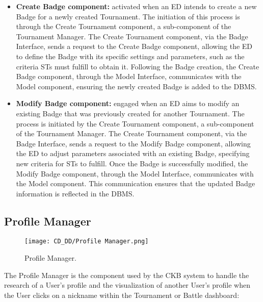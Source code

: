 \begin{itemize}
    \item \textbf{Create Badge component:} activated when an ED intends to create a new Badge for a newly created Tournament. The initiation of this process is through the Create Tournament component, a sub-component of the Tournament Manager. The Create Tournament component, via the Badge Interface, sends a request to the Create Badge component, allowing the ED to define the Badge with its specific settings and parameters, such as the criteria STs must fulfill to obtain it. Following the Badge creation, the Create Badge component, through the Model Interface, communicates with the Model component, ensuring the newly created Badge is added to the DBMS.
    \item \textbf{Modify Badge component:} engaged when an ED aims to modify an existing Badge that was previously created for another Tournament. The process is initiated by the Create Tournament component, a sub-component of the Tournament Manager. The Create Tournament component, via the Badge Interface, sends a request to the Modify Badge component, allowing the ED to adjust parameters associated with an existing Badge, specifying new criteria for STs to fulfill. Once the Badge is successfully modified, the Modify Badge component, through the Model Interface, communicates with the Model component. This communication ensures that the updated Badge information is reflected in the DBMS.
\end{itemize}

\subsection{Profile Manager}
\label{subsec:profile_manager}%

\begin{figure}[H]
    \begin{center}
        \texttt{[image: CD\_DD/Profile Manager.png]}
        \caption{Profile Manager.}
        \label{fig:profile_manager}%
    \end{center}
\end{figure}

\noindent The Profile Manager is the component used by the CKB system to handle the research of a User’s profile and the visualization of another User’s profile when the User clicks on a nickname within the Tournament or Battle dashboard:


